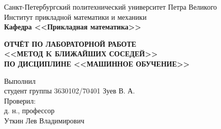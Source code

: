 \documentclass[main.tex]{subfiles}
\begin{document}
\begin{titlepage}
\begin{center}
	\begin{large}
		Санкт-Петербургский политехнический университет Петра Великого\\
		Институт прикладной математики и механики\\
		\textbf{Кафедра <<Прикладная математика>>}\\
	\end{large}
	\vfill
	\Large{\textbf{ОТЧЁТ ПО ЛАБОРАТОРНОЙ РАБОТЕ\\
	<<МЕТОД K БЛИЖАЙШИХ СОСЕДЕЙ>>\\
	ПО ДИСЦИПЛИНЕ <<МАШИННОЕ ОБУЧЕНИЕ>>}}
\end{center}
\vfill
\flushleft
Выполнил\\
студент группы 3630102/70401
\flushright
Зуев В. А.\\
\flushleft
Проверил:\\
д. н., профессор\\
\flushright
Уткин Лев Владимирович\\
\vfill
{}
\end{titlepage}
\end{document}
